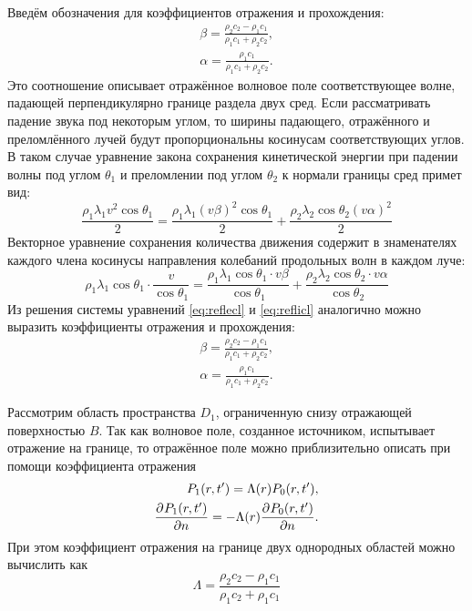 \documentclass[a4paper, fontsize=14pt]{article}
\begin{document}
	Введём обозначения для коэффициентов отражения и прохождения:
	\begin{gather}
		\beta =  \frac{\rho_2 c_2 - \rho_1 c_1}{\rho_1 c_1 + \rho_2 c_2 },\\
		\alpha =  \frac{\rho_1 c_1}{\rho_1 c_1 + \rho_2 c_2 }.
	\end{gather} 
	Это соотношение описывает отражённое волновое поле соответствующее  волне, падающей перпендикулярно границе раздела двух сред. 
	Если рассматривать падение звука под некоторым углом, то ширины падающего, отражённого и преломлённого лучей будут  пропорциональны косинусам соответствующих углов.\cite{zakharov} 
	В таком случае уравнение закона сохранения кинетической энергии при падении волны под углом $\theta_1$ и преломлении под углом $\theta_2$ к нормали границы сред примет вид:
	\begin{equation}
		\frac{\rho_1 \lambda_1 v^2 \cos \theta_1}{2} = \frac{\rho_1 \lambda_1 (v\beta)^2 \cos \theta_1}{2} + \frac{\rho_2 \lambda_2 \cos \theta_2 (v\alpha)^2 }{2}
		\label{eq:reflecl}
	\end{equation}
	Векторное уравнение сохранения количества движения содержит в знаменателях каждого члена косинусы направления колебаний продольных волн в каждом луче:
	\begin{equation}
		\rho_1 \lambda_1 \cos \theta_1 \cdot \frac{v}{\cos \theta_1} = \frac{\rho_1 \lambda_1 \cos \theta_1 \cdot v \beta}{\cos \theta_1} + \frac{\rho_2 \lambda_2 \cos \theta_2 \cdot v\alpha}{\cos\theta_2}
		\label{eq:reflicl}
	\end{equation}
	Из решения системы уравнений \ref{eq:reflecl} и \ref{eq:reflicl} аналогично можно выразить коэффициенты отражения и прохождения:
	\begin{gather}
		\beta =  \frac{\rho_2 c_2 - \rho_1 c_1}{\rho_1 c_1 + \rho_2 c_2 },\\
		\alpha =  \frac{\rho_1 c_1}{\rho_1 c_1 + \rho_2 c_2 }.
	\end{gather} 
	
	Рассмотрим область пространства $D_1$, ограниченную снизу отражающей поверхностью $B$. 
	Так как волновое поле, созданное источником, испытывает отражение на границе, то отражённое поле можно приблизительно описать при помощи коэффициента отражения\cite{zhdanov2007}
	\begin{eqnarray}
		P_1(r,t') = \Lambda(r) P_0(r,t'), \label{eq:lambda}\\
		\frac{\partial ^ {  } P_1(r,t') }{\partial n ^ {  } } = - \Lambda(r) \frac{\partial ^ {  } P_0(r,t')}{\partial n ^ {  } }. \label{eq:lambdadnp0}
	\end{eqnarray}
	При этом коэффициент отражения на границе двух однородных областей можно вычислить как
	\begin{equation}
		\Lambda = \frac{\rho_2 c_2-\rho_1 c_1}{\rho_1 c_2+\rho_1 c_1}
		\label{eq:refl}
	\end{equation}
\end{document}
